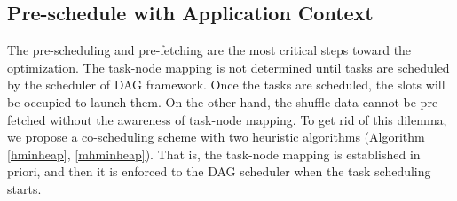 \subsection{Pre-schedule with Application Context}
The pre-scheduling and pre-fetching are the most critical steps toward the optimization. 
The task-node mapping is not determined until tasks are scheduled by the scheduler of DAG framework. 
Once the tasks are scheduled, the slots will be occupied to launch them. 
On the other hand, the shuffle data cannot be pre-fetched without the awareness of task-node mapping.
To get rid of this dilemma, we propose a co-scheduling scheme with two heuristic algorithms (Algorithm \ref{hminheap}, \ref{mhminheap}). 
That is, the task-node mapping is established in priori, and then it is enforced to the DAG scheduler when the task scheduling starts.
